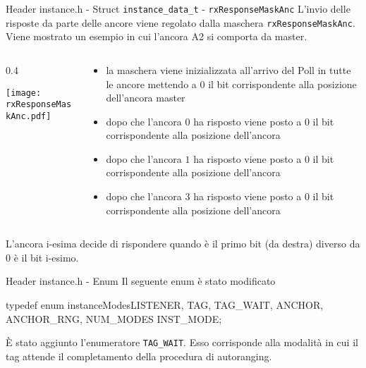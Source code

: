 \begin{frame}[shrink=10]{Header instance.h - Struct \lstinline[language=C]!instance_data_t! - \lstinline[language=C]!rxResponseMaskAnc!}
  L'invio delle risposte da parte delle ancore viene regolato dalla maschera \lstinline[language=C]!rxResponseMaskAnc!.
  Viene mostrato un esempio in cui l'ancora A2 si comporta da master.
  \begin{columns}
    \begin{column}{0.4\textwidth}
      \begin{center}
        \texttt{[image: rxResponseMaskAnc.pdf]}
      \end{center}
    \end{column}
    \begin{column}{0.7\textwidth}
      \begin{itemize}
      \item[1.] la maschera viene inizializzata all'arrivo del Poll in tutte le ancore mettendo a $0$ il bit corrispondente alla posizione dell'ancora master
      \item[2.] dopo che l'ancora $0$ ha risposto viene posto a $0$ il bit corrispondente alla posizione dell'ancora 
      \item[3.] dopo che l'ancora $1$ ha risposto viene posto a $0$ il bit corrispondente alla posizione dell'ancora 
      \item[4.] dopo che l'ancora $3$ ha risposto viene posto a $0$ il bit corrispondente alla posizione dell'ancora 
      \end{itemize}
    \end{column}
  \end{columns}
  \begin{exampleblock}{L'ancora i-esima decide di rispondere}
    quando è il primo bit (da destra) diverso da $0$ è il bit i-esimo.
  \end{exampleblock}
\end{frame}

\begin{frame}[fragile]{Header instance.h - Enum}
  Il seguente enum è stato modificato
  \begin{C}
    typedef enum instanceModes{LISTENER, TAG, TAG_WAIT, ANCHOR, ANCHOR_RNG, NUM_MODES} INST_MODE;
  \end{C}
  È stato aggiunto l'enumeratore \lstinline[language=C]!TAG_WAIT!. Esso corrisponde alla modalità in cui il tag
  attende il completamento della procedura di autoranging.
\end{frame}
